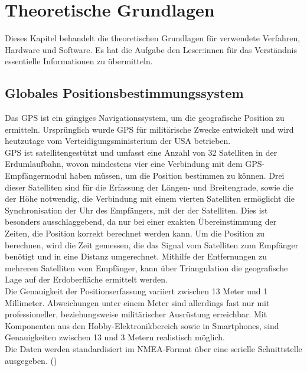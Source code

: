 \section{Theoretische Grundlagen}
\label{sec:theoretGrundl}
Dieses Kapitel behandelt die theoretischen Grundlagen für verwendete Verfahren, Hardware und Software. Es hat die Aufgabe den Leser:innen für das Verständnis essentielle Informationen zu übermitteln.
\subsection{Globales Positionsbestimmungssystem}
\label{subsec:tGPS}
Das \ac{GPS} ist ein gängiges Navigationssystem, um die geografische Position zu ermitteln. Ursprünglich wurde \ac{GPS} für militärische Zwecke entwickelt und wird heutzutage vom Verteidigungsministerium der USA betrieben.\\
\ac{GPS} ist satellitengestützt und umfasst eine Anzahl von 32 Satelliten in der Erdumlaufbahn, wovon mindestens vier eine Verbindung mit dem GPS-Empfängermodul haben müssen, um die Position bestimmen zu können. Drei dieser Satelliten sind für die Erfassung der Längen- und Breitengrade, sowie die der Höhe notwendig, die Verbindung mit einem vierten Satelliten ermöglicht die Synchronisation der Uhr des Empfängers, mit der der Satelliten. Dies ist besonders ausschlaggebend, da nur bei einer exakten Übereinstimmung der Zeiten, die Position korrekt berechnet werden kann. Um die Position zu berechnen, wird die Zeit gemessen, die das Signal vom Satelliten zum Empfänger benötigt und in eine Distanz umgerechnet. Mithilfe der Entfernungen zu mehreren Satelliten vom Empfänger, kann über Triangulation die geografische Lage auf der Erdoberfläche ermittelt werden.\\
Die Genauigkeit der Positionserfassung variiert zwischen 13 Meter und 1 Millimeter. Abweichungen unter einem Meter sind allerdings fast nur mit professioneller, beziehungsweise militärischer Ausrüstung erreichbar. Mit Komponenten aus den Hobby-Elektronikbereich sowie in Smartphones, sind Genauigkeiten zwischen 13 und 3 Metern realistisch möglich.\\
Die Daten werden standardisiert im \ac{NMEA}-Format über eine serielle Schnittstelle ausgegeben. (\cite{schnabelGPS})


